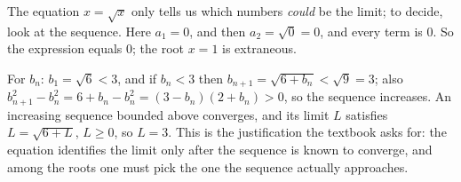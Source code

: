 The equation $x=\sqrt{x}$ only tells us which numbers \emph{could} be the limit; to decide, look at the sequence. Here $a_1=0$, and then $a_2=\sqrt0=0$, and every term is $0$. So the expression equals $\boxed{0}$; the root $x=1$ is extraneous.

For $b_n$: $b_1=\sqrt6<3$, and if $b_n<3$ then $b_{n+1}=\sqrt{6+b_n}<\sqrt9=3$; also $b_{n+1}^2-b_n^2=6+b_n-b_n^2=(3-b_n)(2+b_n)>0$, so the sequence increases. An increasing sequence bounded above converges, and its limit $L$ satisfies $L=\sqrt{6+L}$, $L\ge0$, so $L=3$. This is the justification the textbook asks for: the equation identifies the limit only after the sequence is known to converge, and among the roots one must pick the one the sequence actually approaches.
